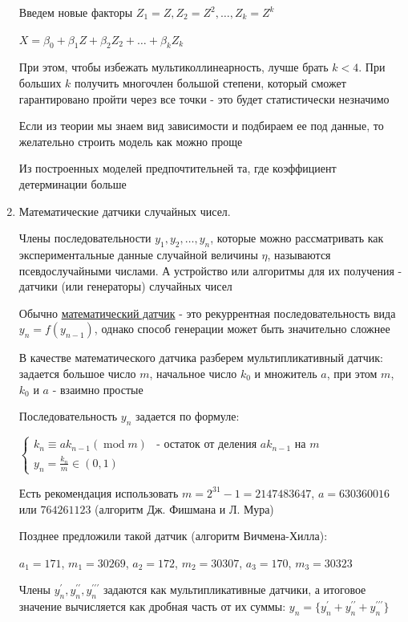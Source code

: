 \begin{enumerate}
    Введем новые факторы $Z_1 = Z, Z_2 = Z^2, \dots, Z_k = Z^k$

    $X = \beta_0 + \beta_1 Z + \beta_2 Z_2 + \dots + \beta_k Z_k$

    При этом, чтобы избежать мультиколлинеарность, лучше брать $k < 4$. При больших $k$ получить многочлен большой степени, который сможет гарантировано пройти через все точки - это будет статистически незначимо

    \Nota Если из теории мы знаем вид зависимости и подбираем ее под данные, то желательно строить модель как можно проще

    \Notas Из построенных моделей предпочтительней та, где коэффициент детерминации больше

    \item Математические датчики случайных чисел.

    \Def Члены последовательности $y_1, y_2, \dots, y_n$, которые можно рассматривать как экспериментальные данные случайной величины $\eta$, называются псевдослучайными числами. А устройство или алгоритмы для их получения - датчики (или генераторы) случайных чисел

    Обычно \hyperlink{mathematical_rng}{математический датчик} - это рекуррентная последовательность вида $y_n = f(y_{n - 1})$, однако способ генерации может быть значительно сложнее

    В качестве математического датчика разберем мультипликативный датчик: задается большое число $m$, начальное число $k_0$ и множитель $a$, при этом $m$, $k_0$ и $a$ - взаимно простые

    Последовательность $y_n$ задается по формуле:

    $\begin{cases}
        k_n \equiv a k_{n - 1} (\operatorname{mod} m) & \text{- остаток от деления }ak_{n - 1}\text{ на }m \\
        y_n = \frac{k_n}{m} \in (0, 1)
    \end{cases}$

    Есть рекомендация использовать $m = 2^{31} - 1 = 2147483647$, $a = 630360016$ или $764261123$ (алгоритм Дж. Фишмана и Л. Мура)

    Позднее предложили такой датчик (алгоритм Вичмена-Хилла):

    $a_1 = 171$, $m_1 = 30269$, $a_2 = 172$, $m_2 = 30307$, $a_3 = 170$, $m_3 = 30323$ 

    Члены $y_n^\prime, y_n^{\prime\prime}, y_n^{\prime\prime\prime}$ задаются как мультипликативные датчики, а итоговое значение вычисляется как дробная часть от их суммы: $y_n = \{y_n^\prime + y_n^{\prime\prime} + y_n^{\prime\prime\prime}\}$


\end{enumerate}
